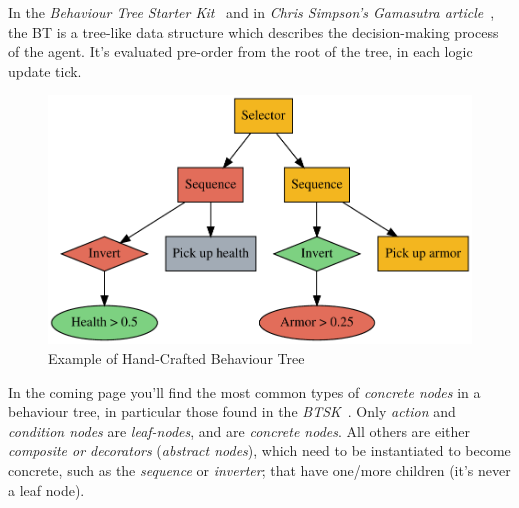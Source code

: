 \documentclass[a4paper, twocolumn]{article}
\begin{document}
        In the \emph{Behaviour Tree Starter Kit}~\cite{champandard2014behaviour} and in \emph{Chris Simpson's Gamasutra article}~\cite{simpson2014behavior}, the BT is a tree-like data structure which describes the decision-making process of the agent. It's evaluated pre-order from the root of the tree, in each logic update tick.

        \begin{figure}[H]
            \centering
            \includegraphics[width=\linewidth]{share/behaviour_tree.pdf}
            \caption{Example of Hand-Crafted Behaviour Tree}
            \label{fig:behaviour_tree}
        \end{figure}

        In the coming page you'll find the most common types of \emph{concrete nodes} in a behaviour tree, in particular those found in the \emph{BTSK}~\cite{champandard2014behaviour}. Only \emph{action} and \emph{condition nodes} are \emph{leaf-nodes}, and are \emph{concrete nodes}. All others are either \emph{composite or decorators} (\emph{abstract nodes}), which need to be instantiated to become concrete, such as the \emph{sequence} or \emph{inverter}; that have one/more children (it's never a leaf node).
\end{document}
